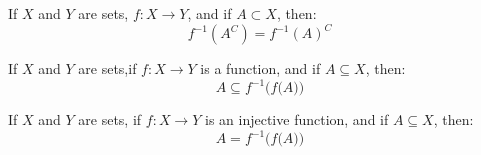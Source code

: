             \begin{theorem}
                If $X$ and $Y$ are sets, $f:X\rightarrow{Y}$,
                and if $A\subset{X}$, then:
                \begin{equation}
                    f^{-1}(A^{C})=f^{-1}(A)^{C}
                \end{equation}
            \end{theorem}
            \begin{theorem}
                If $X$ and $Y$ are sets,if
                $f:X\rightarrow{Y}$ is a function, and if
                $A\subseteq{X}$, then:
                \begin{equation}
                    A\subseteq{f^{-1}\Big(f\big(A\big)\Big)}
                \end{equation}
            \end{theorem}
            \begin{theorem}
                If $X$ and $Y$ are sets, if
                $f:X\rightarrow{Y}$ is an injective function,
                and if $A\subseteq{X}$, then:
                \begin{equation}
                    A=f^{-1}\Big(f\big(A\big)\Big)
                \end{equation}
            \end{theorem}
